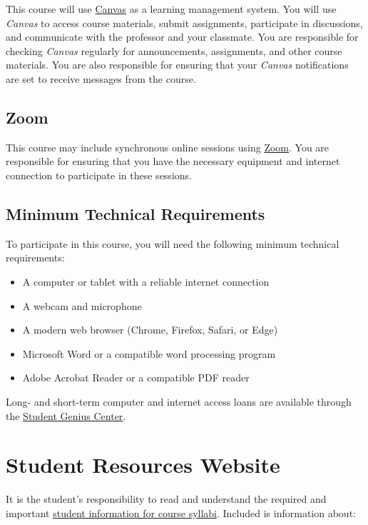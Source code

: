 \documentclass[12pt]{article}     %
\begin{document}
	This course will use \href{https://csufullerton.instructure.com/}{Canvas} as a learning management system. You will use \emph{Canvas} to access course materials, submit assignments, participate in discussions, and communicate with the professor and your classmate. You are responsible for checking \emph{Canvas} regularly for announcements, assignments, and other course materials. You are also responsible for ensuring that your \emph{Canvas} notifications are set to receive messages from the course. 
	
	\subsection*{Zoom}
	This course may include synchronous online sessions using \href{https://fullerton.zoom.us/}{Zoom}. You are responsible for ensuring that you have the necessary equipment and internet connection to participate in these sessions. 
	
	\subsection*{Minimum Technical Requirements}
	
	To participate in this course, you will need the following minimum technical requirements:
	\begin{itemize}
	    \item A computer or tablet with a reliable internet connection
	    \item A webcam and microphone
	    \item A modern web browser (Chrome, Firefox, Safari, or Edge)
	    \item Microsoft Word or a compatible word processing program
	    \item Adobe Acrobat Reader or a compatible PDF reader
	\end{itemize}
	
	
	\noindent Long- and short-term computer and internet access loans are available through the \href{http://www.fullerton.edu/it/students/sgc/index.php}{Student Genius Center}.

\section{Student Resources Website}
It is the student's responsibility to read and understand the required and important \href{https://fdc.fullerton.edu/teaching/student-info-syllabi.html}{student information for course syllabi}. Included is information about:
\end{document}
